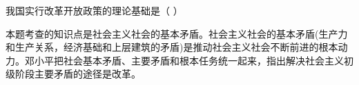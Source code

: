 \question 我国实行改革开放政策的理论基础是（ ）
\par{}
\begin{solution}本题考查的知识点是社会主义社会的基本矛盾。社会主义社会的基本矛盾(生产力和生产关系，经济基础和上层建筑的矛盾)是推动社会主义社会不断前进的根本动力。邓小平把社会基本矛盾、主要矛盾和根本任务统一起来，指出解决社会主义初级阶段主要矛盾的途径是改革。
\end{solution}
